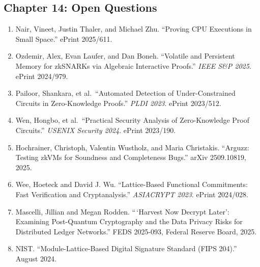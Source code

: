 \documentclass[
  11pt,
  openany]{report}
\providecommand{\tightlist}{%
  \setlength{\itemsep}{0pt}\setlength{\parskip}{0pt}}
\begin{document}
\subsection{Chapter 14: Open Questions}\label{chapter-14-open-questions}

\begin{enumerate}
\def\labelenumi{\arabic{enumi}.}
\setcounter{enumi}{44}
\tightlist
\item
  Nair, Vineet, Justin Thaler, and Michael Zhu. ``Proving CPU Executions in
  Small Space.'' ePrint 2025/611.
\item
  Ozdemir, Alex, Evan Laufer, and Dan Boneh. ``Volatile and Persistent Memory
  for zkSNARKs via Algebraic Interactive Proofs.'' \emph{IEEE S\&P 2025}. ePrint
  2024/979.
\item
  Pailoor, Shankara, et al.~``Automated Detection of Under-Constrained Circuits
  in Zero-Knowledge Proofs.'' \emph{PLDI 2023}. ePrint 2023/512.
\item
  Wen, Hongbo, et al.~``Practical Security Analysis of Zero-Knowledge Proof
  Circuits.'' \emph{USENIX Security 2024}. ePrint 2023/190.
\item
  Hochrainer, Christoph, Valentin Wustholz, and Maria Christakis. ``Arguzz:
  Testing zkVMs for Soundness and Completeness Bugs.'' arXiv 2509.10819, 2025.
\item
  Wee, Hoeteck and David J. Wu. ``Lattice-Based Functional Commitments: Fast
  Verification and Cryptanalysis.'' \emph{ASIACRYPT 2023}. ePrint 2024/028.
\item
  Mascelli, Jillian and Megan Rodden. ``\,`Harvest Now Decrypt Later': Examining
  Post-Quantum Cryptography and the Data Privacy Risks for Distributed Ledger
  Networks.'' FEDS 2025-093, Federal Reserve Board, 2025.
\item
  NIST. ``Module-Lattice-Based Digital Signature Standard (FIPS 204).'' August
  2024.
\end{enumerate}
\end{document}
